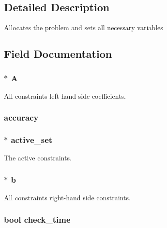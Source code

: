 

\subsection{Detailed Description}
Allocates the problem and sets all necessary variables 

\subsection{Field Documentation}
\hypertarget{structproblem_ac56453eb618f2ce98f20d91442a5690b}{}
\subsubsection[{A}]{$\ast$ A}\label{structproblem_ac56453eb618f2ce98f20d91442a5690b}
All constraints left-\/hand side coefficients. \hypertarget{structproblem_abb02aa4aa436e037d8c806b2364cf97c}{}
\subsubsection[{accuracy}]{ accuracy}\label{structproblem_abb02aa4aa436e037d8c806b2364cf97c}
\hypertarget{structproblem_a27b8b36dc36cb3620e52c6275d0bb87b}{}
\subsubsection[{active\+\_\+set}]{$\ast$ active\+\_\+set}\label{structproblem_a27b8b36dc36cb3620e52c6275d0bb87b}
The active constraints. \hypertarget{structproblem_a844487a6c95b5fd7a6c768f5fdaa24c0}{}
\subsubsection[{b}]{$\ast$ b}\label{structproblem_a844487a6c95b5fd7a6c768f5fdaa24c0}
All constraints right-\/hand side constraints. \hypertarget{structproblem_afb90fd1d52b36f4f03af3b09f7679bd8}{}
\subsubsection[{check\+\_\+time}]{\setlength{\rightskip}{0pt plus 5cm}bool check\+\_\+time}\label{structproblem_afb90fd1d52b36f4f03af3b09f7679bd8}
\hypertarget{structproblem_a012d5476bfafdc0daca39a8f4ae8d2c6}{}
